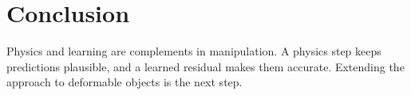 \chapter{Conclusion}
\label{ch:conclusion}

Physics and learning are complements in manipulation. A physics step keeps predictions
plausible, and a learned residual makes them accurate. Extending the approach to deformable
objects is the next step.
